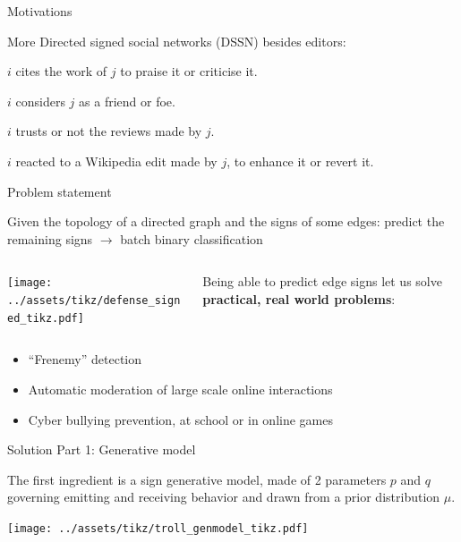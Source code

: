 \documentclass[10pt,svgnames,ignorenonframetext,final]{beamer}
\providecommand{\tightlist}{%
  \setlength{\itemsep}{0pt}\setlength{\parskip}{0pt}}
\providecommand{\largelist}{%
  \setlength{\itemsep}{8pt}\setlength{\parskip}{3pt}}
\begin{document}
\begin{frame}{Motivations}

    More Directed signed social networks (DSSN) besides \wik{} editors:
\begin{description}
    \largelist
\item[\aut{}]
\(i\) cites the work of \(j\) to praise it or criticise it.

\item[\sla{}]
\(i\) considers \(j\) as a friend or foe.

\item[\epi{}]
\(i\) trusts or not the reviews made by \(j\).

\item[\kiw{}]
\(i\) reacted to a Wikipedia edit made by \(j\), to enhance it or revert it.
\end{description}

\end{frame}

\begin{frame}{Problem statement}

  Given the topology of a directed graph and the signs of some edges:
  predict the remaining signs \(\rightarrow\) batch binary
  classification

\begin{columns}[c]
\begin{column}{.55\textwidth}
    \texttt{[image: ../assets/tikz/defense\_signed\_tikz.pdf]}
\end{column}%
\hfill%
\begin{column}{.44\textwidth}
  Being able to predict edge signs let us solve \textbf{practical, real world problems}:
\end{column}%
\end{columns}
  \begin{itemize}
    \tightlist
  \item
    ``Frenemy'' detection%
  \item
    Automatic moderation of large scale online interactions
  \item
    Cyber bullying prevention, at school or in online games%
\end{itemize}

\end{frame}

\begin{frame}{Solution Part 1: Generative model}
\protect\hypertarget{solution-part-1-generative-model}{}

The first ingredient is a sign generative model, made of 2 parameters $p$ and $q$
governing emitting and receiving behavior and drawn from a prior distribution $\mu$.

\begin{center}
\texttt{[image: ../assets/tikz/troll\_genmodel\_tikz.pdf]}
\end{center}

\end{frame}
\end{document}
